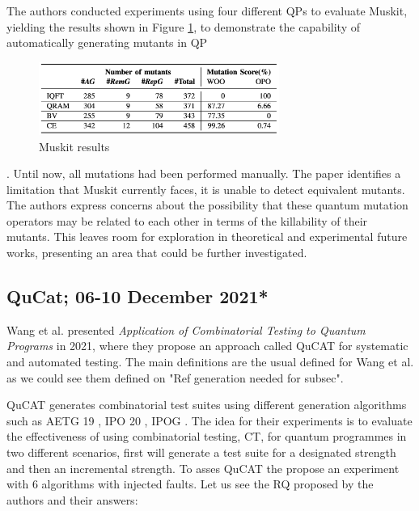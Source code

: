 \begin{itemize}
The authors conducted experiments using four different QPs to evaluate Muskit, yielding the results shown in Figure \ref{Fig:MuskitRes}, to demonstrate the capability of automatically generating mutants in QP

\begin{figure}[H]
        \centering
        \includegraphics[width=0.7\textwidth]{TFM/photos/MuskitResults.png}
        \caption{Muskit results \cite{mendiluze2021muskit}} 
        \label{Fig:MuskitRes}
\end{figure}

. Until now, all mutations had been performed manually. The paper identifies a limitation that Muskit currently faces, it is unable to detect equivalent mutants. The authors express concerns about the possibility that these quantum mutation operators may be related to each other in terms of the killability of their mutants. This leaves room for exploration in theoretical and experimental future works, presenting an area that could be further investigated.

\vspace{15pt}
\subsection{QuCat; 06-10 December 2021*}

Wang et al. presented \textit{Application of Combinatorial Testing to Quantum Programs} \cite{wang2021application} in 2021, where they propose an approach called QuCAT for systematic and automated testing. The main definitions are the usual defined for Wang et al. as we could see them defined on "Ref generation needed for subsec".\newline

QuCAT generates combinatorial test suites using different generation algorithms such as AETG 19 \cite{cohen1997aetg}, IPO 20 \cite{lei1998parameter}, IPOG \cite{lei2007ipog}. The idea for their experiments is to evaluate the effectiveness of using combinatorial testing, CT, for quantum programmes in two different scenarios, first will generate a test suite for a designated strength and then an incremental strength. To asses QuCAT the propose an experiment with 6 algorithms with injected faults. Let us see the RQ proposed by the authors and their answers:


\end{itemize}
